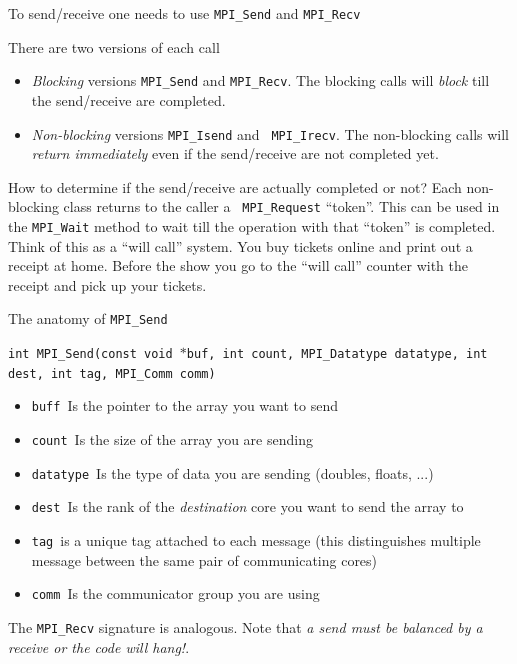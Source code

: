 \documentclass[aspectratio=169]{beamer}
\newcommand{\mypause}{\pause}
\newcommand{\myb}[1]{{\color{blue} {#1}}}
\begin{document}
\begin{frame}{To send/receive one needs to use {\tt MPI\_Send} and
    {\tt MPI\_Recv}}

  There are two versions of each call
  \begin{itemize}
  \item \emph{Blocking} versions {\tt MPI\_Send} and {\tt MPI\_Recv}.
    The blocking calls will \emph{block} till the send/receive are
    completed.
  \item \emph{Non-blocking} versions {\tt MPI\_Isend} and {\tt
      MPI\_Irecv}.   The non-blocking calls will \emph{return immediately} even if the
    send/receive are not completed yet.
  \end{itemize}
  \mypause%
  \vskip0.1in%
  How to determine if the send/receive are actually completed or not?%
  \vskip0.1in%
  {\color{blue} Each non-blocking class returns to the caller a {\tt
      MPI\_Request} ``token''. This can be used in the {\tt MPI\_Wait}
    method to wait till the operation with that ``token'' is
    completed.}%
  \vskip0.1in%
  Think of this as a ``will call'' system. You buy tickets online and
  print out a receipt at home. Before the show you go to the ``will
  call'' counter with the receipt and pick up your tickets.

\end{frame}

\begin{frame}{The anatomy of {\tt MPI\_Send}}

  {\color{blue} {\tt int MPI\_Send(const void $*$buf, int count,
      MPI\_Datatype datatype, int dest, int tag, MPI\_Comm comm)}}
  \begin{itemize}
  \item \myb{{\tt buff}}\ Is the pointer to the array you want to send
  \item \myb{\tt count}\ Is the size of the array you are sending
  \item \myb{\tt datatype}\ Is the type of data you are sending (doubles,
    floats, ...)
  \item \myb{\tt dest}\ Is the rank of the \emph{destination} core you want
    to send the array to
  \item \myb{\tt tag}\ is a unique tag attached to each message (this
    distinguishes multiple message between the same pair of
    communicating cores)
  \item \myb{\tt comm}\ Is the communicator group you are using
  \end{itemize}
  The {\tt MPI\_Recv} signature is analogous. Note that \emph{a send
    must be balanced by a receive or the code will hang!}.

\end{frame}
\end{document}
